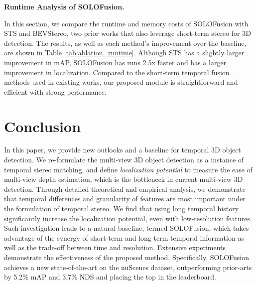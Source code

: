 \documentclass[runningheads, hyperfootnotes=false]{article}
\begin{document}
\noindent\textbf{Runtime Analysis of SOLOFusion.}
\begin{table*}
\centering
\captionsetup{aboveskip=0pt}\captionsetup{belowskip=0pt}
\label{tab:ablation_runtime}
\tiny
{}
\end{table*}
 In this section, we compare the runtime and memory costs of SOLOFusion with STS and BEVStereo, two prior works that also leverage short-term stereo for 3D detection. The results, as well as each method's improvement over the baseline, are shown in Table \ref{tab:ablation_runtime}. Although STS has a slightly larger improvement in mAP, SOLOFusion has runs 2.5x faster and has a larger improvement in localization. Compared to the short-term temporal fusion methods used in existing works, our proposed module is straightforward and efficient with strong performance. \section{Conclusion}
In this paper, we provide new outlooks and a baseline for temporal 3D object detection. We re-formulate the multi-view 3D object detection as a instance of temporal stereo matching, and define \textit{localization potential} to measure the ease of multi-view depth estimation, which is the bottleneck in current multi-view 3D detection. Through detailed theoretical and empirical analysis, we demonstrate that temporal differences and granularity of features are most important under the formulation of temporal stereo. We find that using long temporal history significantly increase the localization potential, even with low-resolution features. Such investigation leads to a natural baseline, termed SOLOFusion, which takes advantage of the synergy of short-term and long-term temporal information as well as the trade-off between time and resolution. Extensive experiments demonstrate the effectiveness of the proposed method. Specifically, SOLOFusion achieves a new state-of-the-art on the nuScenes dataset, outperforming prior-arts by 5.2\% mAP and 3.7\% NDS and placing the top in the leaderboard.  


\end{document}
